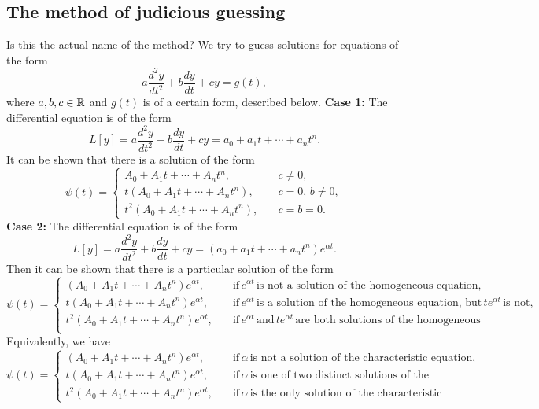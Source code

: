 \subsection{The method of judicious guessing}
Is this the actual name of the method? We try to guess solutions for equations of the form 
\begin{equation}\label{ncsode}
    a \frac{d^2y}{dt^2}+b \frac{dy}{dt}+cy=g(t),
\end{equation}
where $a,b,c\in \mathbb{R}$ and $g(t)$ is of a certain form, described below.
\vspace{0.25cm}
\noindent\textbf{Case 1:} The differential equation is of the form \[
    L[y]=a \frac{d^2y}{dt^2}+b \frac{dy}{dt}+cy=a_0+a_1t+\cdots +a_nt^n.
\] It can be shown that there is a solution of the form \[
\psi(t)=
\begin{cases}
    A_0+A_1t+\cdots+A_nt^n,&\quad c\neq 0,\\
    t(A_0+A_1t+\cdots+A_nt^n),&\quad c=0,\,b\neq 0,\\
    t^2(A_0+A_1t+\cdots+A_nt^n),&\quad c=b=0.
\end{cases}
\] 
\noindent\textbf{Case 2:} The differential equation is of the form \[
    L[y]=a  \frac{d^2y}{dt^2}+b \frac{dy}{dt}+cy=(a_0+a_1t+\cdots + a_nt^n)e^{\alpha t}.
\] Then it can be shown that there is a particular solution of the form \[
\psi(t)=
\begin{cases}
    (A_0+A_1t+\cdots+A_nt^n)e^{\alpha t},&\quad \text{if}\, e^{\alpha t}\, \text{is not a solution of the homogeneous equation,}\\
    t(A_0+A_1t+\cdots+A_nt^n)e^{\alpha t},&\quad \text{if}\, e^{\alpha t}\, \text{is a solution of the homogeneous equation, but}\,te^{\alpha t}\,\text{is not,}\\
    t^2(A_0+A_1t+\cdots+A_nt^n)e^{\alpha t},&\quad \text{if}\, e^{\alpha t}\, \text{and}\,te^{\alpha t}\,\text{are both solutions of the homogeneous equation.}\\
\end{cases}
\] Equivalently, we have\[
\psi(t)=
\begin{cases}
    (A_0+A_1t+\cdots+A_nt^n)e^{\alpha t},&\quad \text{if}\, \alpha\, \text{is not a solution of the characteristic equation,}\\
    t(A_0+A_1t+\cdots+A_nt^n)e^{\alpha t},&\quad \text{if}\, \alpha \, \text{is one of two distinct solutions of the characteristic,}\\
    t^2(A_0+A_1t+\cdots+A_nt^n)e^{\alpha t},&\quad \text{if}\, \alpha\, \text{is the only solution of the characteristic equation.}
\end{cases}
\] 
